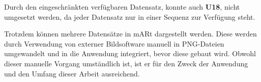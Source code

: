 Durch den eingeschränkten verfügbaren Datensatz, konnte auch \textbf{U18}, nicht umgesetzt werden, da jeder Datensatz nur in einer Sequenz zur Verfügung steht.

Trotzdem können mehrere Datensätze in mARt dargestellt werden. Diese werden durch Verwendung von externer Bildsoftware manuell in PNG-Dateien umgewandelt und in die Anwendung integriert, bevor diese gebaut wird. 
Obwohl dieser manuelle Vorgang umständlich ist, ist er für den Zweck der Anwendung und den Umfang dieser Arbeit ausreichend.
